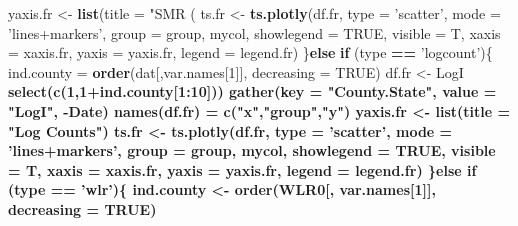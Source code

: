 \documentclass[]{book}
\newenvironment{Shaded}{\begin{snugshade}}{\end{snugshade}}
\newcommand{\KeywordTok}[1]{\textcolor[rgb]{0.13,0.29,0.53}{\textbf{#1}}}
\newcommand{\DataTypeTok}[1]{\textcolor[rgb]{0.13,0.29,0.53}{#1}}
\newcommand{\DecValTok}[1]{\textcolor[rgb]{0.00,0.00,0.81}{#1}}
\newcommand{\StringTok}[1]{\textcolor[rgb]{0.31,0.60,0.02}{#1}}
\newcommand{\OtherTok}[1]{\textcolor[rgb]{0.56,0.35,0.01}{#1}}
\newcommand{\ControlFlowTok}[1]{\textcolor[rgb]{0.13,0.29,0.53}{\textbf{#1}}}
\newcommand{\OperatorTok}[1]{\textcolor[rgb]{0.81,0.36,0.00}{\textbf{#1}}}
\newcommand{\NormalTok}[1]{#1}
\begin{document}
\begin{Shaded}
\begin{Highlighting}[]
{{{{{{{{{{{{{\NormalTok{    yaxis.fr <-}\StringTok{ }\KeywordTok{list}\NormalTok{(}\DataTypeTok{title =} \StringTok{"SMR (%
\NormalTok{    ts.fr <-}\StringTok{ }\KeywordTok{ts.plotly}\NormalTok{(df.fr, }\DataTypeTok{type =} \StringTok{'scatter'}\NormalTok{, }
                       \DataTypeTok{mode =} \StringTok{'lines+markers'}\NormalTok{,}
                       \DataTypeTok{group =}\NormalTok{ group, mycol, }\DataTypeTok{showlegend =} \OtherTok{TRUE}\NormalTok{, }
                       \DataTypeTok{visible =}\NormalTok{ T, }\DataTypeTok{xaxis =}\NormalTok{ xaxis.fr, }
                       \DataTypeTok{yaxis =}\NormalTok{ yaxis.fr, }\DataTypeTok{legend =}\NormalTok{ legend.fr)}
\NormalTok{  \}}\ControlFlowTok{else} \ControlFlowTok{if}\NormalTok{ (type }\OperatorTok{==}\StringTok{ 'logcount'}\NormalTok{)\{}
\NormalTok{    ind.county =}\StringTok{ }\KeywordTok{order}\NormalTok{(dat[,var.names[}\DecValTok{1}\NormalTok{]], }\DataTypeTok{decreasing =} \OtherTok{TRUE}\NormalTok{)}
\NormalTok{    df.fr <-}\StringTok{ }\NormalTok{LogI }\OperatorTok{%
\StringTok{      }\KeywordTok{select}\NormalTok{(}\KeywordTok{c}\NormalTok{(}\DecValTok{1}\NormalTok{,}\DecValTok{1}\OperatorTok{+}\NormalTok{ind.county[}\DecValTok{1}\OperatorTok{:}\DecValTok{10}\NormalTok{])) }\OperatorTok{%
\StringTok{      }\KeywordTok{gather}\NormalTok{(}\DataTypeTok{key =} \StringTok{"County.State"}\NormalTok{, }\DataTypeTok{value =} \StringTok{"LogI"}\NormalTok{, }\OperatorTok{-}\NormalTok{Date)}
    \KeywordTok{names}\NormalTok{(df.fr) =}\StringTok{ }\KeywordTok{c}\NormalTok{(}\StringTok{"x"}\NormalTok{,}\StringTok{"group"}\NormalTok{,}\StringTok{"y"}\NormalTok{)}
\NormalTok{    yaxis.fr <-}\StringTok{ }\KeywordTok{list}\NormalTok{(}\DataTypeTok{title =} \StringTok{"Log Counts"}\NormalTok{)}
\NormalTok{    ts.fr <-}\StringTok{ }\KeywordTok{ts.plotly}\NormalTok{(df.fr, }\DataTypeTok{type =} \StringTok{'scatter'}\NormalTok{, }
                       \DataTypeTok{mode =} \StringTok{'lines+markers'}\NormalTok{,}
                       \DataTypeTok{group =}\NormalTok{ group, mycol, }
                       \DataTypeTok{showlegend =} \OtherTok{TRUE}\NormalTok{, }\DataTypeTok{visible =}\NormalTok{ T,}
                       \DataTypeTok{xaxis =}\NormalTok{ xaxis.fr, }\DataTypeTok{yaxis =}\NormalTok{ yaxis.fr, }
                       \DataTypeTok{legend =}\NormalTok{ legend.fr)}
\NormalTok{  \}}\ControlFlowTok{else} \ControlFlowTok{if}\NormalTok{ (type }\OperatorTok{==}\StringTok{ 'wlr'}\NormalTok{)\{}
\NormalTok{    ind.county <-}\StringTok{ }\KeywordTok{order}\NormalTok{(WLR0[, var.names[}\DecValTok{1}\NormalTok{]], }\DataTypeTok{decreasing =} \OtherTok{TRUE}\NormalTok{)}
}}}}}}}}}}}}}}}}
\end{Highlighting}
\end{Shaded}
\end{document}
